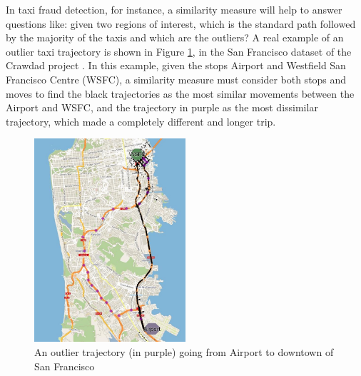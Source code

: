 \documentclass[12pt]{article}
\begin{document}
{In taxi fraud detection, for instance, a similarity measure will help to answer questions like: given two regions of interest, which is the standard path followed by the majority of the taxis and which are the outliers?
A real example of an outlier taxi trajectory is shown in Figure {\ref{fig:crawdad_outlier}}, in the San Francisco dataset of the Crawdad project} \citep{epfl-mobility-20090224}. {In this example, given the stops Airport and  Westfield San Francisco Centre (WSFC), a similarity measure must consider both stops and moves to find the black trajectories as the most similar movements between the Airport and WSFC, and the trajectory in purple as the most dissimilar trajectory, which made a completely different and longer trip.}
 
\begin{figure}[h]
\centering
\includegraphics[width=0.5\textwidth]{Images/CRAWDAD-Outlier.jpg}
\caption{\label{fig:crawdad_outlier} An outlier trajectory (in purple) going from Airport to downtown of San Francisco}
\end{figure}


\end{document}
